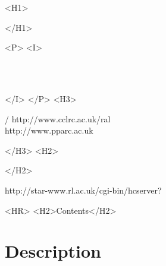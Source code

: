 \begin{htmlonly}
   \xlabel{}
   \begin{rawhtml} <H1> \end{rawhtml}
      \stardoctitle
   \begin{rawhtml} </H1> \end{rawhtml}


   \begin{rawhtml} <P> <I> \end{rawhtml}
   \stardoccategory \stardocnumber \\
   \stardocauthors \\
   \stardocdate
   \begin{rawhtml} </I> </P> <H3> \end{rawhtml}
       /
                        {http://www.cclrc.ac.uk/ral} \\
                        {http://www.pparc.ac.uk} \\
   \begin{rawhtml} </H3> <H2> \end{rawhtml}
   \begin{rawhtml} </H2> \end{rawhtml}
      {http://star-www.rl.ac.uk/cgi-bin/hcserver?\stardocsource}\\

  \label{stardoccontents}
  \begin{rawhtml} 
    <HR>
    <H2>Contents</H2>
  \end{rawhtml}
  \renewcommand{\latexonlytoc}[0]{}

  \section{Description}

\end{htmlonly}

